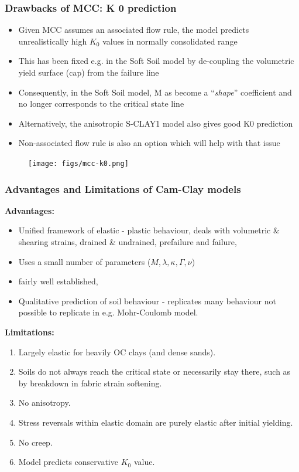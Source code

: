 \documentclass[notes]{beamer}
\begin{document}
\begin{frame}
\frametitle{Drawbacks of MCC: K 0 prediction}
\noindent
\fboxsep=0pt
\noindent
\begin{minipage}[t]{0.65\linewidth}
	\begin{itemize}
		\item Given MCC assumes an associated flow
		rule, the model predicts unrealistically high
		$K_0$ values in normally consolidated range
		\item This has been fixed e.g. in the Soft Soil
		model by de-coupling the volumetric yield
		surface (cap) from the failure line
		\item Consequently, in the Soft Soil model, M
		as become a ``\textit{shape}'' coefficient and no 	longer corresponds to the critical state
		line
		\item Alternatively, the anisotropic S-CLAY1
		model also gives good K0 prediction
		\item Non-associated flow rule is also an option which will help with that issue
	\end{itemize}
	
\end{minipage}%
\hfill
\begin{minipage}[t]{0.35\linewidth}
	\begin{figure}
		\texttt{[image: figs/mcc-k0.png]}
	\end{figure}
\end{minipage}	
\end{frame}

\begin{frame}
\frametitle{Advantages and Limitations of Cam-Clay models}
\textbf{Advantages:}
\begin{itemize}
	\item Unified framework of elastic - plastic behaviour, deals with volumetric \& shearing
	strains, drained \& undrained, prefailure and failure,
	\item Uses a small number of parameters ($M, \lambda, \kappa, \Gamma, \nu$)
	\item fairly well established,
	\item Qualitative prediction of soil behaviour
	- replicates many behaviour not possible to replicate in e.g. Mohr-Coulomb model.
\end{itemize}
\textbf{Limitations:}
\begin{enumerate}
	\item Largely elastic for heavily OC clays (and dense sands).
	\item Soils do not always reach the critical state or necessarily stay there, such as by
	breakdown in fabric strain softening.
	\item No anisotropy.
	\item Stress reversals within elastic domain are purely elastic after initial yielding.
	\item No creep.
	\item Model predicts conservative $K_0$ value.
\end{enumerate}
\end{frame}
\end{document}
